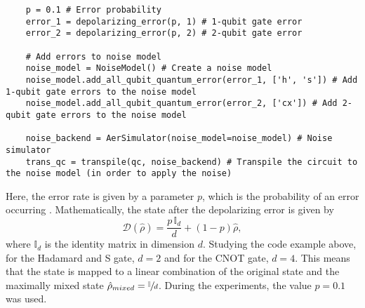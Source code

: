 \documentclass[a4paper,12pt]{article}
\begin{document}
\begin{tcolorbox}[title = {\footnotesize\textbf{Code Snippet, Depolarizing Noise Model}}, colback=black!15!white, colframe=black]
    \begin{adjustwidth}{0.25cm}{0cm}
    
    {\footnotesize 
    \begin{verbatim}
    p = 0.1 # Error probability
    error_1 = depolarizing_error(p, 1) # 1-qubit gate error
    error_2 = depolarizing_error(p, 2) # 2-qubit gate error

    # Add errors to noise model
    noise_model = NoiseModel() # Create a noise model
    noise_model.add_all_qubit_quantum_error(error_1, ['h', 's']) # Add 1-qubit gate errors to the noise model
    noise_model.add_all_qubit_quantum_error(error_2, ['cx']) # Add 2-qubit gate errors to the noise model

    noise_backend = AerSimulator(noise_model=noise_model) # Noise simulator
    trans_qc = transpile(qc, noise_backend) # Transpile the circuit to the noise model (in order to apply the noise)
    \end{verbatim}
    }
    \end{adjustwidth}
\end{tcolorbox}

Here, the error rate is given by a parameter $p$, which is the probability of an error occurring \cite{nielsen_chuang}. Mathematically, the state after the depolarizing error is given by
\begin{equation} \label{depolarizing}
    \mathcal{D}(\hat{\rho}) = \frac{p\,\mathbb{I}_d}{d} + (1-p)\hat{\rho},
\end{equation}
where $\mathbb{I}_d$ is the identity matrix in dimension $d$. Studying the code example above, for the Hadamard and S gate, $d=2$ and for the CNOT gate, $d=4$. This means that the state is mapped to a linear combination of the original state and the maximally mixed state $\hat{\rho}_{mixed} = \sfrac{\mathbb{I}}{d}$. During the experiments, the value $p = 0.1$ was used.
\end{document}

